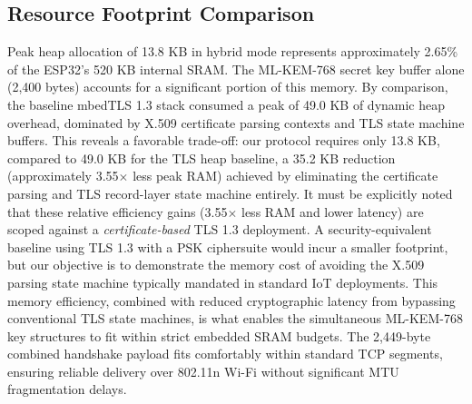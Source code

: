 \documentclass[journal, 10pt]{IEEEtran}
\begin{document}
\begin{table}[htbp]
\caption{Physical TLS 1.3 Handshake Wall-Clock Baseline (ESP32-D0WD-V3 @ 160 MHz)}
\label{tab:mbedtls}
\begin{center}
\end{center}
\end{table}

\subsection{Resource Footprint Comparison}
Peak heap allocation of 13.8 KB in hybrid mode represents approximately 2.65\% of the ESP32's 520 KB internal SRAM. The ML-KEM-768 secret key buffer alone (2,400 bytes) accounts for a significant portion of this memory. By comparison, the baseline mbedTLS 1.3 stack consumed a peak of 49.0 KB of dynamic heap overhead, dominated by X.509 certificate parsing contexts and TLS state machine buffers. This reveals a favorable trade-off: our protocol requires only 13.8 KB, compared to 49.0 KB for the TLS heap baseline, a 35.2 KB reduction (approximately 3.55$\times$ less peak RAM) achieved by eliminating the certificate parsing and TLS record-layer state machine entirely. It must be explicitly noted that these relative efficiency gains (3.55$\times$ less RAM and lower latency) are scoped against a \textit{certificate-based} TLS 1.3 deployment. A security-equivalent baseline using TLS 1.3 with a PSK ciphersuite would incur a smaller footprint, but our objective is to demonstrate the memory cost of avoiding the X.509 parsing state machine typically mandated in standard IoT deployments. This memory efficiency, combined with reduced cryptographic latency from bypassing conventional TLS state machines, is what enables the simultaneous ML-KEM-768 key structures to fit within strict embedded SRAM budgets. The 2,449-byte combined handshake payload fits comfortably within standard TCP segments, ensuring reliable delivery over 802.11n Wi-Fi without significant MTU fragmentation delays.
\end{document}
